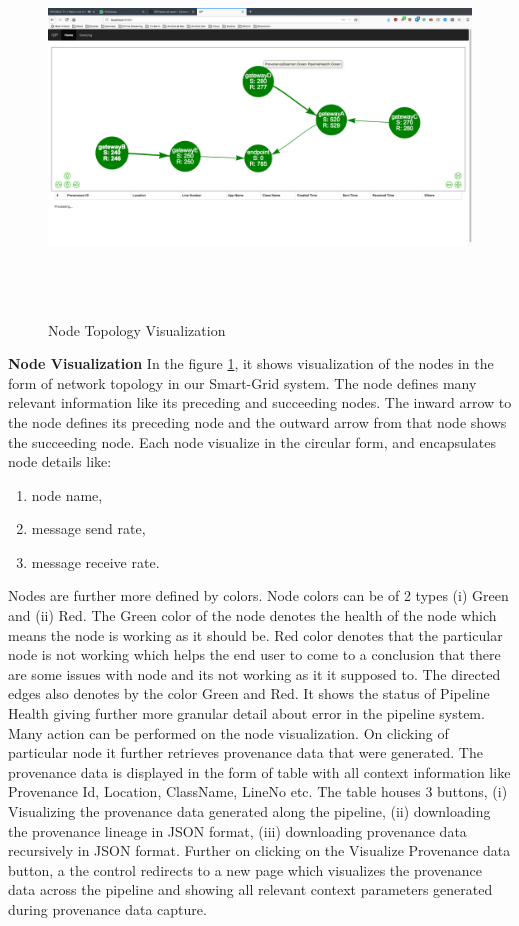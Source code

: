 \begin{figure}
    \centering
    \includegraphics[width=\textwidth,height=10cm,keepaspectratio]{figures/node_visualization.png}
    \caption{\label{fig:nodes}Node Topology Visualization}
\end{figure}

\textbf{Node Visualization} In the figure \ref{fig:nodes}, it shows visualization of the nodes in the form of network topology in our  Smart-Grid system. The node defines many relevant information like its preceding and succeeding nodes. The inward arrow to the node defines its preceding node and the outward arrow from that node shows the succeeding node. Each node visualize in the circular form, and encapsulates node details like:
\begin{enumerate}
    \item node name,
    \item message send rate,
    \item message receive rate.
\end{enumerate}
Nodes are further more defined by colors. Node colors can be of 2 types (i) Green and (ii) Red. The Green color of the node denotes the health of the node which means the node is working as it should be. Red color denotes that the particular node is not working which helps the end user to come to a conclusion that there are some issues with node and its not working as it it supposed to. The directed edges also denotes by the color Green and Red. It shows the status of Pipeline Health giving further more granular detail about error in the pipeline system.
\newline
Many action can be performed on the node visualization. On clicking of particular node it further retrieves provenance data that were generated. The provenance data is displayed in the form of table with all context information like Provenance Id, Location, ClassName, LineNo etc. The table houses 3 buttons, (i) Visualizing the provenance data generated along the pipeline, (ii) downloading the provenance lineage in JSON format, (iii) downloading provenance data recursively in JSON format.
\newline
Further on clicking on the Visualize Provenance data button, a the control redirects to a new page which visualizes the provenance data across the pipeline and showing all relevant context parameters generated during provenance data capture.
